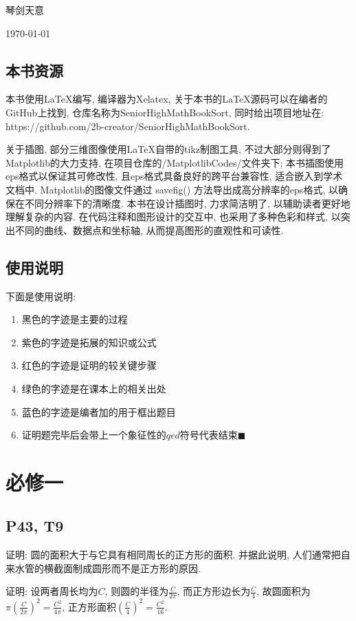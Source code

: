 \documentclass{book}
\begin{document}
    {\hfill 琴剑天意}

    {\hfill \today}

    \section{本书资源}
    本书使用\LaTeX 编写, 编译器为Xelatex, 关于本书的\LaTeX 源码可以在编者的GitHub上找到, 仓库名称为SeniorHighMathBookSort, 同时给出项目地址在: \\https://github.com/2b-creator/SeniorHighMathBookSort.

    关于插图, 部分三维图像使用\LaTeX 自带的tikz制图工具, 不过大部分则得到了Matplotlib的大力支持, 在项目仓库的/MatplotlibCodes/文件夹下; 本书插图使用eps格式以保证其可修改性, 且eps格式具备良好的跨平台兼容性, 适合嵌入到学术文档中. Matplotlib的图像文件通过 savefig() 方法导出成高分辨率的eps格式, 以确保在不同分辨率下的清晰度. 本书在设计插图时, 力求简洁明了, 以辅助读者更好地理解复杂的内容. 在代码注释和图形设计的交互中, 也采用了多种色彩和样式, 以突出不同的曲线、数据点和坐标轴, 从而提高图形的直观性和可读性. 
    \section{使用说明}

    下面是使用说明: 
    \begin{enumerate}
        \item 黑色的字迹是主要的过程
        \item \textcolor[rgb]{0.38,0.11,0.2}{紫色的字迹是拓展的知识或公式}
        \item \textcolor[rgb]{0.75,0.17,0.22}{红色的字迹是证明的较关键步骤}
        \item \textcolor[rgb]{0.11,0.65,0.52}{绿色的字迹是在课本上的相关出处}
        \item \textcolor[rgb]{0.13,0.47,0.72}{蓝色的字迹是编者加的用于框出题目}
        \item 证明题完毕后会带上一个象征性的$qed$符号代表结束$\blacksquare$
    \end{enumerate}
    \chapter{必修一}
    \section{\textcolor[rgb]{0.11,0.65,0.52}{P43, T9}}
    \begin{boxB}
        证明: 圆的面积大于与它具有相同周长的正方形的面积. 并据此说明, 人们通常把自来水管的横截面制成圆形而不是正方形的原因.
    \end{boxB}
    \doublespacing
    证明: 设两者周长均为$C$, 则圆的半径为$\displaystyle \frac{C}{2\pi}$, 而正方形边长为$\displaystyle \frac{C}{4}$, 故圆面积为$\displaystyle \pi(\frac{C}{2\pi})^2=\frac{C^2}{4\pi}$, 正方形面积$\displaystyle (\frac{C}{4})^2=\frac{C^2}{16}$.
\end{document}
